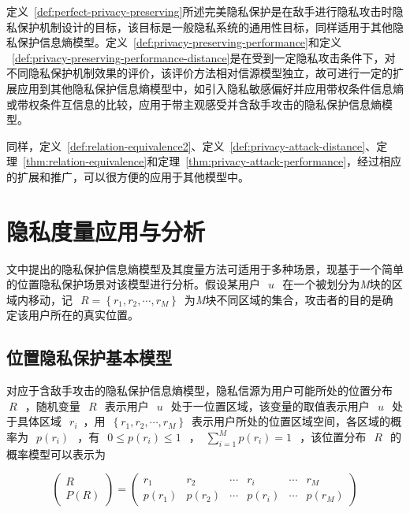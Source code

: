 定义~\ref{def:perfect-privacy-preserving}所述完美隐私保护是在敌手进行隐私攻击时隐私保护机制设计的目标，该目标是一般隐私系统的通用性目标，同样适用于其他隐私保护信息熵模型。定义~\ref{def:privacy-preserving-performance}和定义	~\ref{def:privacy-preserving-performance-distance}是在受到一定隐私攻击条件下，对不同隐私保护机制效果的评价，该评价方法相对信源模型独立，故可进行一定的扩展应用到其他隐私保护信息熵模型中，如引入隐私敏感偏好并应用带权条件信息熵或带权条件互信息的比较，应用于带主观感受并含敌手攻击的隐私保护信息熵模型。

同样，定义~\ref{def:relation-equivalence2}、定义~\ref{def:privacy-attack-distance}、定理~\ref{thm:relation-equivalence}和定理~\ref{thm:privacy-attack-performance}，经过相应的扩展和推广，可以很方便的应用于其他模型中。

\section{隐私度量应用与分析}\label{instance analysis}

文中提出的隐私保护信息熵模型及其度量方法可适用于多种场景，现基于一个简单的位置隐私保护场景对该模型进行分析。假设某用户~$~u~$~在一个被划分为\textit{M}块的区域内移动，记~$~R=\left \{ r_{1},r_{2},\cdots,r_{M} \right \}$~为\textit{M}块不同区域的集合，攻击者的目的是确定该用户所在的真实位置。
\subsection{位置隐私保护基本模型}
对应于含敌手攻击的隐私保护信息熵模型，隐私信源为用户可能所处的位置分布~$~R~$~，随机变量~$~R~$~表示用户~$~u~$~处于一位置区域，该变量的取值表示用户~$~u~$~处于具体区域~$~r_{i}$~，用~$\left \{ r_{1},r_{2},\cdots,r_{M} \right \}$~表示用户所处的位置区域空间，各区域的概率为~$~p(r_{i})~$~，有~$~0\leqslant p(r_{i})\leqslant 1~$~，~$\sum_{i=1}^{M}p(r_{i})=1~$~，该位置分布~$~R~$~的概率模型可以表示为

\begin{equation}
\begin{pmatrix}
R\\ 
P(R)
\end{pmatrix}=\begin{pmatrix}
r_{1} & r_{2} & \cdots  & r_{i} & \cdots  & r_{M}\\ 
p(r_{1})& p(r_{2}) & \cdots & p(r_{i}) & \cdots & p(r_{M})
\end{pmatrix}
\end{equation}

